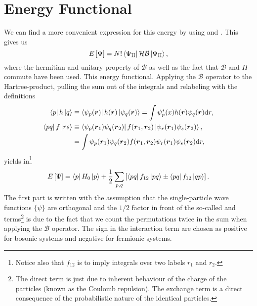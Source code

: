 \section{Energy Functional\label{sec:energyFunc}}
    We can find a more convenient expression for this energy by using
     and . This gives us
        \begin{equation}
            E\left[\Psi\right] =
            N!\bra{\Psi_{\text{H}}}\mathcal{H}\mathcal{B}\ket{\Psi_{\text{H}}},
        \end{equation}
    where the hermitian and unitary property of $\mathcal{B}$ as well as the
    fact that $\mathcal{B}$ and $H$ commute have been used. This energy
    functional. Applying the $\mathcal{B}$ operator to the Hartree-product,
    pulling the sum out of the integrals and relabeling with the definitions 
        \begin{equation}
            \begin{aligned}
                \bra{p}h\ket{q} &\equiv
                \bra{\psi_p(\boldsymbol{{r}})}h(\boldsymbol{{r}})\ket{\psi_q(\boldsymbol{{r}})} =
                \int\psi^{*}_p(x)h(\boldsymbol{{r}})\psi_q(\boldsymbol{{r}})\mathrm{d} r, \\
                \bra{pq}f\ket{rs} &\equiv
                \bra{\psi_p(\boldsymbol{{r}}_1)\psi_q(\boldsymbol{{r}}_2)}
                f(\boldsymbol{{r}}_1,\boldsymbol{{r}}_2)
                \ket{\psi_r(\boldsymbol{{r}}_1)\psi_s(\boldsymbol{{r}}_2)}, \nonumber \\
                &= \int \psi_p(\boldsymbol{{r}}_1)\psi_q(\boldsymbol{{r}}_2)
                f(\boldsymbol{{r}}_1,\boldsymbol{{r}}_2) \psi_r(\boldsymbol{{r}}_1)\psi_s(\boldsymbol{{r}}_2)
                \mathrm{d} r,
            \end{aligned}
            \label{eq:defhredefbleh}
        \end{equation}
    yields in\footnote{Notice also that $f_{12}$ is to imply integrals over two
    labels $r_1$ and $r_2$.}
        \begin{equation}
            E\left[\Psi\right] = \bra{p}H_0\ket{p} +
            \frac{1}{2}\sum_{p,q}\left[\bra{pq}f_{12}\ket{pq} \pm
            \bra{pq}f_{12}\ket{qp}\right].
            \label{eq:ch3Efunc}
        \end{equation}
    The first part is written with the assumption that the single-particle wave
    functions $\{\psi\}$ are orthogonal and the $1/2$ factor in front of the
    so-called  and  terms\footnote{The direct
    term is just due to inherent behaviour of the charge of the particles
    (known as the Coulomb repulsion). The exchange term is a direct consequence
    of the probabilistic nature of the identical particles.} is due to the fact
    that we count the permutations twice in the sum when applying the
    $\mathcal{B}$ operator. The sign in the interaction term are chosen as
    positive for bosonic systems and negative for fermionic systems.

